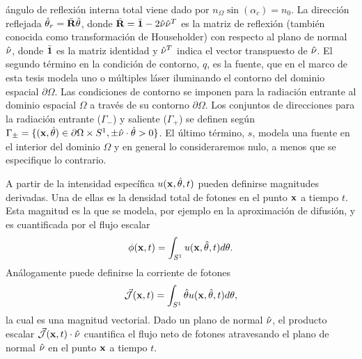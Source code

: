 ángulo de reflexión interna total viene dado por $n_{\Omega} \sin(\alpha_c)=n_0$.
La dirección reflejada $\hat{\theta}_r=\bar{\mathbf{R}} \hat{\theta}$, donde $\bar{\mathbf{R}} =\bar{\mathbf{1}}-2\hat{\nu} \hat{\nu}^T$ es la matriz de reflexión 
(también conocida como transformación de Householder) con respecto al plano de normal $\hat{\nu}$, donde $\bar{\mathbf{1}}$ 
es la matriz identidad y $\hat{\nu}^T$ 
indica el vector transpuesto de $\hat{\nu}$.   El 
segundo término en la condición de contorno, $q$, es la fuente, que en el marco de esta tesis 
modela uno o múltiples láser iluminando el contorno del dominio espacial $\partial \Omega$. 
Las condiciones de contorno se imponen para la radiación entrante 
al dominio espacial $\Omega$ a través de su contorno $\partial \Omega$. 
Los conjuntos de direcciones para la radiación entrante ($\Gamma_-$) y saliente ($\Gamma_+$) 
se definen según $\Gamma_{\pm}=\{(\mathbf{x},\hat{\theta}) \in \partial \Omega \times S^1, 
\pm \hat \nu \cdot \hat{\theta} >0 \}$. 
El último término, $s$, modela una fuente en el interior 
del dominio $\Omega$ y en general lo consideraremos nulo, a menos 
que se especifique lo contrario. 

A partir de la intensidad específica $u(\mathbf{x},\hat{\theta},t)$ pueden definirse magnitudes derivadas. 
Una de ellas es la densidad total de fotones 
en el punto $\mathbf{x}$ a tiempo $t$. Esta magnitud es la que se modela, por ejemplo
en la aproximación de difusión, y es cuantificada por el flujo escalar
\begin{equation}
  \phi(\mathbf{x},t)=\int_{S^1} u(\mathbf{x},\hat{\theta},t) d\theta.
\label{eq:photondensity}
\end{equation}
Análogamente puede definirse la corriente de fotones 
\begin{equation}
 \vec{ \mathcal{J}}(\mathbf{x},t)=\int_{S^1} \hat{\theta} u(\mathbf{x},\hat{\theta},t) d\theta,
\label{eq:photoncurrent}
\end{equation}
la cual es una magnitud vectorial. Dado un plano de normal $\hat{\nu}$, 
el producto escalar $\vec{ \mathcal{J}}(\mathbf{x},t) \cdot \hat{\nu}$ 
cuantifica el flujo neto de fotones atravesando el plano de normal $ \hat{\nu}$ 
en el punto $\mathbf{x}$ a tiempo $t$.

